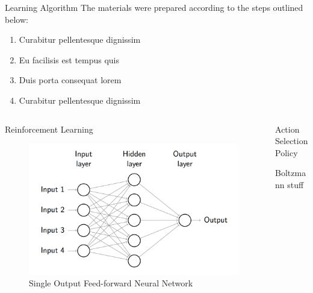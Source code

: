 \documentclass[final]{beamer}
\newlength{\onecolwid}
\newlength{\twocolwid}
\begin{document}
\begin{frame}[t]
\begin{columns}[t]
\begin{column}{\twocolwid}
\begin{block}{Learning Algorithm}
		The materials were prepared according to the steps outlined below:

		\begin{enumerate}
		\item Curabitur pellentesque dignissim
		\item Eu facilisis est tempus quis
		\item Duis porta consequat lorem
		\item Curabitur pellentesque dignissim
		\end{enumerate}

	\end{block}

\begin{columns}[t,totalwidth=\twocolwid]

\begin{column}{\onecolwid}\begin{block}{Reinforcement Learning}

	\begin{figure}
		\centering
		\includegraphics[width=\linewidth]{Figures/FeedForwardRendered}
		\caption{Single Output Feed-forward Neural Network}
		\label{fig:feedforward}
	\end{figure}

\end{block}\end{column}

\begin{column}{\onecolwid}\begin{block}{Action Selection Policy}
	
	Boltzmann stuff

\end{block}\end{column} 


\end{columns}
\end{column}
\end{columns}
\end{frame}
\end{document}
